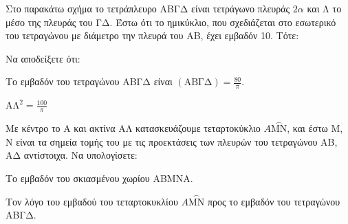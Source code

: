 Στο παρακάτω σχήμα το τετράπλευρο ΑΒΓΔ είναι τετράγωνο πλευράς $2\alpha$ και Λ το μέσο της πλευράς του ΓΔ. Έστω ότι το ημικύκλιο, που σχεδιάζεται στο εσωτερικό του τετραγώνου με διάμετρο την πλευρά του ΑΒ, έχει εμβαδόν 10. Τότε:
\begin{alist}
    \item Να αποδείξετε ότι:
    \begin{rlist}
        \item Το εμβαδόν του τετραγώνου ΑΒΓΔ είναι $(\text{ΑΒΓΔ}) = \frac{80}{\pi}$. 
        \item $\text{ΑΛ}^2 = \frac{100}{\pi}$ 
    \end{rlist}
    \item Με κέντρο το Α και ακτίνα ΑΛ κατασκευάζουμε τεταρτοκύκλιο $A\stackrel{\frown}{\text{MN}}$, και έστω M, N είναι τα σημεία τομής του με τις προεκτάσεις των πλευρών του τετραγώνου ΑΒ, ΑΔ αντίστοιχα. Να υπολογίσετε:
    \begin{rlist}
        \item Το εμβαδόν του σκιασμένου χωρίου ΑΒΜΝΑ. 
        \item Τον λόγο του εμβαδού του τεταρτοκυκλίου $A\stackrel{\frown}{\text{MN}}$ προς το εμβαδόν του τετραγώνου ΑΒΓΔ. 
    \end{rlist}
\end{alist}